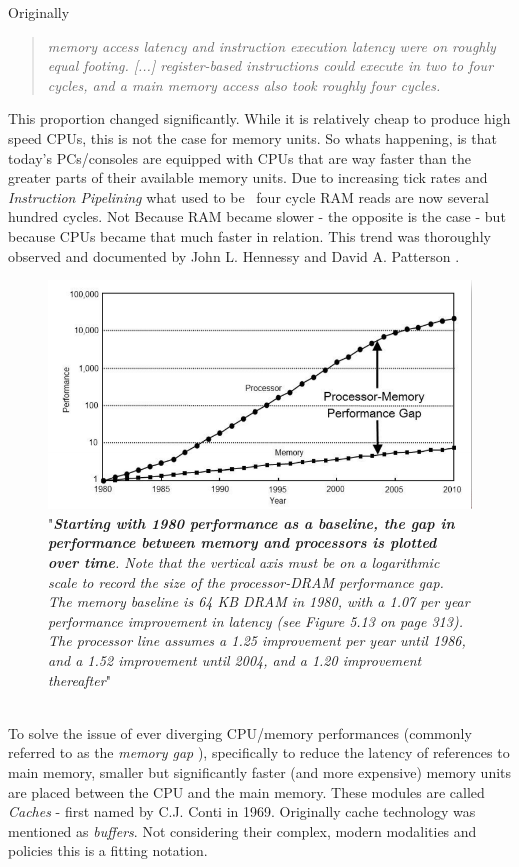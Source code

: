 Originally
\begin{quote}
	\textit{memory access latency and instruction execution latency were on roughly equal footing. [...] register-based instructions could execute in two to four cycles, and a main memory access also took roughly four cycles.} 
\end{quote}
This proportion changed significantly. While it is relatively cheap to produce high speed CPUs, this is not the case for memory units. So whats happening, is that today's PCs/consoles are equipped with CPUs that are way faster than the greater parts of their available memory units. Due to increasing tick rates and \textit{Instruction Pipelining} what used to be ~four cycle RAM reads are now several hundred cycles. Not Because RAM became slower - the opposite is the case - but because CPUs became that much faster in relation.
This trend was thoroughly observed and documented by John L. Hennessy and David A. Patterson .\\
\begin{figure}[!htbp]
	\centering
	\includegraphics[width=0.7\linewidth]{PICs/cpu_memory_gap}
	\caption{"\textit{\textbf{Starting with 1980 performance as a baseline, the gap in performance
			between memory and processors is plotted over time}.
			Note that the vertical axis
			must be on a logarithmic scale to record the size of the processor-DRAM performance
			gap. The memory baseline is 64 KB DRAM in 1980, with a 1.07 per year performance
			improvement in latency (see Figure 5.13 on page 313). The processor line assumes a
			1.25 improvement per year until 1986, and a 1.52 improvement until 2004, and a 1.20
			improvement thereafter}" }\label{cpu_memory_gap}
\end{figure}\\
To solve the issue of ever diverging CPU/memory performances (commonly referred to as the \textit{memory gap }), specifically to reduce the latency of references to main memory, smaller but significantly faster (and more expensive) memory units are placed between the CPU and the main memory. These modules are called \textit{Caches} - first named by C.J. Conti  in 1969. Originally cache technology was mentioned as \textit{buffers}. Not considering their complex, modern modalities and policies this is a fitting notation.\\
